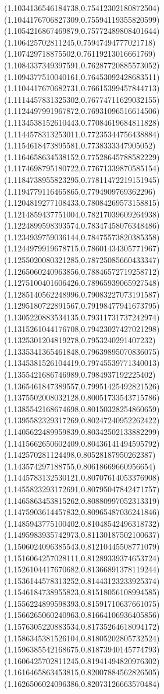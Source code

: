 \documentclass[12pt]{article}
\theoremstyle{plain}
\theoremstyle{definition}
\theoremstyle{remark}
\begin{document}
\begin{figure}
{  (1.1034136546184738,0.75412302180872504)%
  (1.1044176706827309,0.75594119355820599)%
  (1.1054216867469879,0.75772489808401644)%
  (1.106425702811245,0.75947494777021718)%
  (1.107429718875502,0.76119213016661769)%
  (1.1084337349397591,0.76287720885573052)%
  (1.1094377510040161,0.76453092428683511)%
  (1.1104417670682731,0.76615399457844713)%
  (1.1114457831325302,0.76774711629032155)%
  (1.1124497991967872,0.76931096516614506)%
  (1.1134538152610443,0.77084619684811828)%
  (1.1144578313253011,0.77235344756438884)%
  (1.1154618473895581,0.7738333347905052)%
  (1.1164658634538152,0.77528645788582229)%
  (1.1174698795180722,0.77671339870585154)%
  (1.1184738955823295,0.77811472219151945)%
  (1.1194779116465865,0.7794909769362296)%
  (1.1204819277108433,0.78084269573158815)%
  (1.1214859437751004,0.78217039609264938)%
  (1.1224899598393574,0.78347458076348486)%
  (1.1234939759036144,0.78475573820385358)%
  (1.1244979919678715,0.78601434305771967)%
  (1.1255020080321285,0.78725085660433347)%
  (1.1265060240963856,0.78846572719258712)%
  (1.1275100401606426,0.78965939065927548)%
  (1.1285140562248996,0.79083227073191587)%
  (1.1295180722891567,0.79198477941673795)%
  (1.1305220883534135,0.79311731737242974)%
  (1.1315261044176708,0.79423027427021298)%
  (1.1325301204819278,0.7953240291407232)%
  (1.1335341365461848,0.79639895070836075)%
  (1.1345381526104419,0.79745539771340013)%
  (1.1355421686746989,0.7984937192225402)%
  (1.1365461847389557,0.79951425492821526)%
  (1.1375502008032128,0.80051733543715786)%
  (1.1385542168674698,0.80150328254860659)%
  (1.1395582329317269,0.80247240952262422)%
  (1.1405622489959839,0.80342502133882299)%
  (1.1415662650602409,0.80436141494595792)%
  (1.142570281124498,0.80528187950262387)%
  (1.143574297188755,0.80618669660956654)%
  (1.1445783132530121,0.80707614053376908)%
  (1.1455823293172691,0.80795047842471757)%
  (1.1465863453815262,0.80880997052313319)%
  (1.1475903614457832,0.80965487036241846)%
  (1.1485943775100402,0.81048542496318732)%
  (1.1495983935742973,0.81130187502100637)%
  (1.1506024096385543,0.81210445508771079)%
  (1.1516064257028111,0.81289339374653724)%
  (1.1526104417670682,0.81366891378119244)%
  (1.1536144578313252,0.81443123233925374)%
  (1.1546184738955823,0.81518056108994585)%
  (1.1556224899598393,0.81591710637661075)%
  (1.1566265060240963,0.81664106936405856)%
  (1.1576305220883534,0.81735264618094172)%
  (1.1586345381526104,0.81805202805732524)%
  (1.1596385542168675,0.81873940145774793)%
  (1.1606425702811245,0.81941494820976302)%
  (1.1616465863453815,0.82007884562826505)%
  (1.1626506024096386,0.82073126663570484)%
}
\end{figure}
\end{document}
